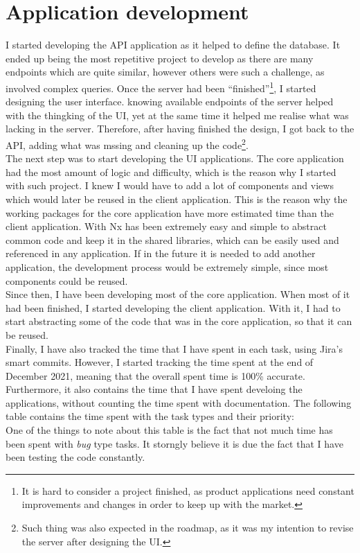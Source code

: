 \documentclass[a4paper, 12pt, oneside]{book}
\begin{document}
\section{Application development}
I started developing the API application as it helped to define the database. It ended up being the most repetitive project to develop as there are many endpoints which are quite similar, however others were such a challenge, as involved complex queries. Once the server had been ``finished''\footnote{It is hard to consider a project finished, as product applications need constant improvements and changes in order to keep up with the market.}, I started designing the user interface. knowing available endpoints of the server helped with the thingking of the UI, yet at the same time it helped me realise what was lacking in the server. Therefore, after having finished the design, I got back to the API, adding what was mssing and cleaning up the code\footnote{Such thing was also expected in the roadmap, as it was my intention to revise the server after designing the UI.}.
\\[8pt]
The next step was to start developing the UI applications. The core application had the most amount of logic and difficulty, which is the reason why I started with such project. I knew I would have to add a lot of components and views which would later be reused in the client application. This is the reason why the working packages for the core application have more estimated time than the client application. With Nx has been extremely easy and simple to abstract common code and keep it in the shared libraries, which can be easily used and referenced in any application. If in the future it is needed to add another application, the development process would be extremely simple, since most components could be reused.
\\[8pt]
Since then, I have been developing most of the core application. When most of it had been finished, I started developing the client application. With it, I had to start abstracting some of the code that was in the core application, so that it can be reused.
\\[8pt]
Finally, I have also tracked the time that I have spent in each task, using Jira's smart commits. However, I started tracking the time spent at the end of December 2021, meaning that the overall spent time is 100\% accurate. Furthermore, it also contains the time that I have spent develoing the applications, without counting the time spent with documentation. The following table contains the time spent with the task types and their priority:
\\[8pt]
One of the things to note about this table is the fact that not much time has been spent with \emph{bug} type tasks. It storngly believe it is due the fact that I have been testing the code constantly.
\end{document}
